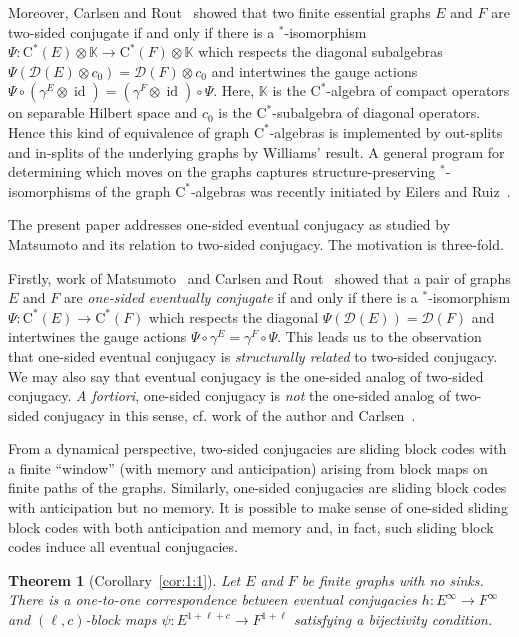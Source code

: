 \documentclass[12pt,a4paper,oneside,reqno,final]{amsart}
\newcommand{\LRA}{\longrightarrow}
\newcommand{\D}{\mathcal{D}}
\newcommand{\K}{\mathbb{K}}
\DeclareMathOperator{\id}{id}
\newtheorem*{theorem*}{Theorem}
\theoremstyle{definition}
\numberwithin{equation}{section} %
\begin{document}
Moreover, Carlsen and Rout~\cite{Carlsen-Rout} showed that two finite essential graphs $E$ and $F$ are two-sided conjugate if and only if
there is a $^*$-isomorphism $\Psi\colon \mathrm{C^*}(E)\otimes \K \LRA \mathrm{C^*}(F)\otimes \K$ which respects the diagonal subalgebras
$\Psi(\D(E)\otimes c_0) = \D(F)\otimes c_0$ and intertwines the gauge actions $\Psi\circ (\gamma^E\otimes \id) = (\gamma^F\otimes \id)\circ \Psi$.
Here, $\K$ is the $\mathrm{C^*}$-algebra of compact operators on separable Hilbert space and $c_0$ is the $\mathrm{C^*}$-subalgebra of diagonal operators.
Hence this kind of equivalence of graph $\mathrm{C^*}$-algebras is implemented by out-splits and in-splits of the underlying graphs by Williams' result.
A general program for determining which moves on the graphs captures structure-preserving $^*$-isomorphisms of the graph $\mathrm{C^*}$-algebras 
was recently initiated by Eilers and Ruiz~\cite{Eilers-Ruiz}.


The present paper addresses one-sided eventual conjugacy as studied by Matsumoto and its relation to two-sided conjugacy.
The motivation is three-fold.

Firstly, work of Matsumoto~\cite{Mat2017-circle,Mat17-UCOE} and Carlsen and Rout~\cite{Carlsen-Rout} showed that a pair of graphs $E$ and $F$ are \emph{one-sided eventually conjugate} if and only if
there is a $^*$-isomorphism $\Psi\colon \mathrm{C^*}(E) \LRA \mathrm{C^*}(F)$ which respects the diagonal $\Psi(\D(E)) = \D(F)$
and intertwines the gauge actions $\Psi\circ \gamma^E = \gamma^F\circ \Psi$.
This leads us to the observation that one-sided eventual conjugacy is \emph{structurally related} to two-sided conjugacy.
We may also say that eventual conjugacy is the one-sided analog of two-sided conjugacy.
\emph{A fortiori}, one-sided conjugacy is \emph{not} the one-sided analog of two-sided conjugacy in this sense, cf. work of the author and Carlsen~\cite{BC}.

From a dynamical perspective, two-sided conjugacies are sliding block codes with a finite ``window'' (with memory and anticipation)
arising from block maps on finite paths of the graphs.
Similarly, one-sided conjugacies are sliding block codes with anticipation but no memory.
It is possible to make sense of one-sided sliding block codes with both anticipation and memory 
and, in fact, such sliding block codes induce all eventual conjugacies.

\begin{theorem*}[Corollary~\ref{cor:1:1}]
    Let $E$ and $F$ be finite graphs with no sinks.
    There is a one-to-one correspondence between eventual conjugacies $h\colon E^\infty \LRA F^\infty$ and
    $(\ell, c)$-block maps $\psi\colon E^{1 + \ell + c} \LRA F^{1 + \ell}$ satisfying a bijectivity condition.
\end{theorem*}
\end{document}

